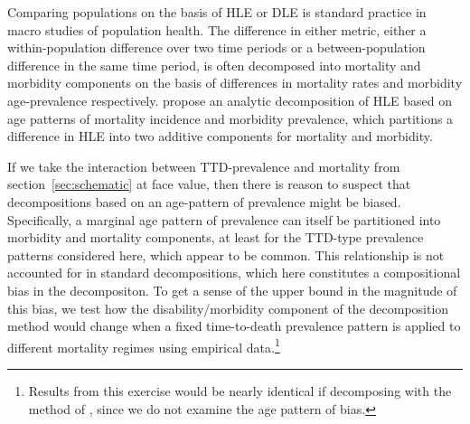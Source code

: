 \documentclass[12pt,oneside,a4paper]{article} %
\begin{document}
Comparing populations on the basis of HLE or DLE is standard practice in macro studies of population
health. The difference in either metric, either a within-population difference
over two time periods or a between-population difference in the same time
period, is often decomposed into mortality and morbidity components on the basis
of differences in mortality rates and morbidity age-prevalence respectively.
\citet{Andreev2002} propose an analytic decomposition of HLE based on age patterns of mortality
incidence and morbidity prevalence, which partitions a difference in HLE into
two additive components for mortality and morbidity.


If we take the interaction between TTD-prevalence and mortality from
section~\ref{sec:schematic} at face value, then there is reason to suspect that
decompositions based on an age-pattern of prevalence might be biased.
Specifically, a marginal age pattern of prevalence can itself be partitioned
into morbidity and mortality components, at least for the TTD-type prevalence
patterns considered here, which appear to be common.
This relationship is not accounted for in standard decompositions, which here constitutes a compositional bias in the decompositon.
To get a sense of the upper bound in the magnitude of this bias, we test how the disability/morbidity
component of the \citet{Andreev2002} decomposition method would change when a fixed time-to-death
prevalence pattern is applied to different mortality regimes using empirical data.\footnote{Results from this exercise would be nearly identical if decomposing with the method of \citet{Nusselder2004}, since we do not examine the age pattern of bias.} %
\end{document}
